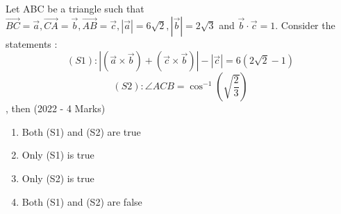     \item{
        
            Let ABC be a triangle such that $ \overrightarrow{BC}=\overrightarrow{a},\overrightarrow{CA}=\overrightarrow{b},\overrightarrow{AB}=\overrightarrow{c},\left|\overrightarrow{a}\right|=6\sqrt{2},\left|\overrightarrow{b}\right|=2\sqrt{3}$ and $\overrightarrow{b}\cdot\overrightarrow{c}=1.$ 
            Consider the statements : $$ \left(S1\right):\left|\left(\overrightarrow{a}\times\overrightarrow{b}\right)+\left(\overrightarrow{c}\times\overrightarrow{b}\right)\right|-\left|\overrightarrow{c}\right|=6\left(2\sqrt{2}-1\right)$$ $$ \left(S2\right):\angle ACB=\cos^{-1}\left(\sqrt{\frac{2}{3}}\right) $$, then \text{ }
             \hfill
              {(2022 - 4 Marks)}
			\begin{multicols}{2}              
	              		\begin{enumerate}
	              			\item Both (S1) and (S2) are true
	              			\item Only (S1) is true
	              			\item Only (S2) is true
	              			\item Both (S1) and (S2) are false
	              	\end{enumerate}
  			\end{multicols}      
        }



